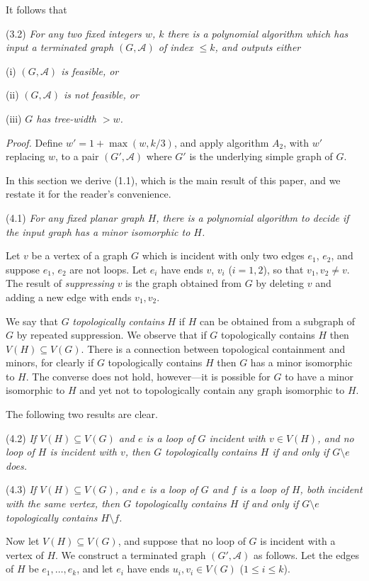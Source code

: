 It follows that

\stmt
(3.2) \textit{For any two fixed integers $w$, $k$ there is a polynomial algorithm which has input a terminated graph $(G, \mathscr{A})$ of index $\le k$, and outputs either}

\hspace*{12pt}(i) \textit{$(G, \mathscr{A})$ is feasible, or}

\hspace*{12pt}(ii) \textit{$(G, \mathscr{A})$ is not feasible, or}

\hspace*{12pt}(iii) \textit{$G$ has tree-width $> w$.}

\textit{Proof.} Define $w' = 1 + \max(w, k/3)$, and apply algorithm $A_2$, with $w'$ replacing $w$, to a pair $(G', \mathscr{A})$ where $G'$ is the underlying simple graph of $G$.


In this section we derive (1.1), which is the main result of this paper, and we restate it for the reader's convenience.

\stmt
(4.1) \textit{For any fixed planar graph $H$, there is a polynomial algorithm to decide if the input graph has a minor isomorphic to $H$.}

Let $v$ be a vertex of a graph $G$ which is incident with only two edges $e_1$, $e_2$, and suppose $e_1$, $e_2$ are not loops. Let $e_i$ have ends $v$, $v_i$ ($i = 1, 2$), so that $v_1, v_2 \ne v$. The result of \textit{suppressing} $v$ is the graph obtained from $G$ by deleting $v$ and adding a new edge with ends $v_1, v_2$.

We say that $G$ \textit{topologically contains} $H$ if $H$ can be obtained from a subgraph of $G$ by repeated suppression. We observe that if $G$ topologically contains $H$ then $V(H) \subseteq V(G)$. There is a connection between topological containment and minors, for clearly if $G$ topologically contains $H$ then $G$ has a minor isomorphic to $H$. The converse does not hold, however---it is possible for $G$ to have a minor isomorphic to $H$ and yet not to topologically contain any graph isomorphic to $H$.

The following two results are clear.

\stmt
(4.2) \textit{If $V(H) \subseteq V(G)$ and $e$ is a loop of $G$ incident with $v \in V(H)$, and no loop of $H$ is incident with $v$, then $G$ topologically contains $H$ if and only if $G \setminus e$ does.}

\stmt
(4.3) \textit{If $V(H) \subseteq V(G)$, and $e$ is a loop of $G$ and $f$ is a loop of $H$, both incident with the same vertex, then $G$ topologically contains $H$ if and only if $G \setminus e$ topologically contains $H \setminus f$.}

Now let $V(H) \subseteq V(G)$, and suppose that no loop of $G$ is incident with a vertex of $H$. We construct a terminated graph $(G', \mathscr{A})$ as follows. Let the edges of $H$ be $e_1, \dots, e_k$, and let $e_i$ have ends $u_i, v_i \in V(G)$ ($1 \le i \le k$).
